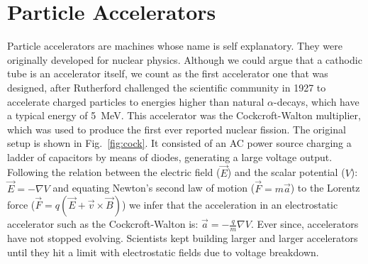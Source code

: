
\chapter{Particle Accelerators}
\label{c:accel} %
Particle accelerators are machines whose name is self explanatory. They were
originally developed for nuclear physics. Although we could argue that a
cathodic tube is an accelerator itself, we count as the first accelerator one
that was designed, after Rutherford challenged the scientific community in 1927
to accelerate charged particles to energies higher than natural
$\alpha$-decays\cite{Steere2005timeline}, which have a typical energy of
\SI{5}{MeV}.
This accelerator was the Cockcroft-Walton multiplier, which was used to produce the first ever reported nuclear fission. The original setup
is shown in Fig.~\ref{fig:cock}. It consisted of an AC power source charging a
ladder of capacitors by means of diodes, generating a large voltage
output\cite{Cockcroft619}. Following the relation between the electric field
($\vec{E}$) and the scalar potential ($V$): $\vec{E}=-\nabla{V}$ and equating
Newton's second law of motion ($\vec{F}=m\vec{a}$) to the Lorentz force
($\vec{F}=q(\vec{E}+\vec{v}\times\vec{B})$) we infer that the acceleration in an
electrostatic accelerator such as the Cockcroft-Walton is:
$\vec{a}=-\frac{q}{m}\nabla{}V$. Ever since, accelerators have not stopped
evolving. Scientists kept building larger and larger accelerators until they hit
a limit with electrostatic fields due to voltage breakdown\cite{EASTHAM1984101}.

